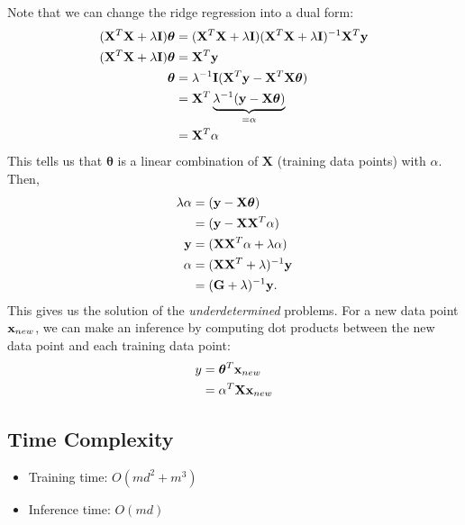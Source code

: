 Note that we can change the ridge regression into a dual form:
\begin{align}
	(\mathbf{X}^T\mathbf{X}+\lambda\mathbf{I})\boldsymbol{\theta}	&= (\mathbf{X}^T\mathbf{X}+\lambda\mathbf{I})(\mathbf{X}^T\mathbf{X}+\lambda\mathbf{I})^{-1}\mathbf{X}^T{\mathbf{y}}\\
	(\mathbf{X}^T\mathbf{X}+\lambda\mathbf{I})\boldsymbol{\theta} &= \mathbf{X}^T{\mathbf{y}}\\ 
	\boldsymbol{\theta} &= \lambda^{-1}\mathbf{I}(\mathbf{X}^T{\mathbf{y}}-\mathbf{X}^T\mathbf{X}\boldsymbol{\theta})\\
						&= \mathbf{X}^T\underbrace{\lambda^{-1}({\mathbf{y}}-\mathbf{X}\boldsymbol{\theta})}_{=\alpha}\\
	&= \mathbf{X}^T\alpha
\end{align}
This tells us that $\boldsymbol{\theta}$ is a linear combination of $\boldsymbol{X}$ (\ie training data points) with $\alpha$. Then, 
\begin{align}
	\lambda\alpha &= ({\mathbf{y}}-\mathbf{X}\boldsymbol{\theta})\\
	&= ({\mathbf{y}}-\mathbf{X}\mathbf{X}^T\alpha)\\
	{\mathbf{y}} &= (\mathbf{X}\mathbf{X}^T\alpha+\lambda\alpha)\\
	\alpha &= (\mathbf{X}\mathbf{X}^T+\lambda)^{-1}{\mathbf{y}}\\
	 &= (\mathbf{G}+\lambda)^{-1}{\mathbf{y}}.
	\label{eq:dual_regression}
\end{align}
This gives us the solution of the \textit{underdetermined} problems. For a new data point ${\mathbf{x}}_{new}$, we can make an inference by computing dot products between the new data point and each training data point:
\begin{align*}
	y &= \boldsymbol{\theta}^T{\mathbf{x}}_{new}\\
	  &= \alpha^T\mathbf{X}{\mathbf{x}}_{new}
\end{align*}

\subsection{Time Complexity}
\begin{itemize}
	\item Training time: $O(md^2+m^3)$
	\item Inference time: $O(md)$
\end{itemize}


